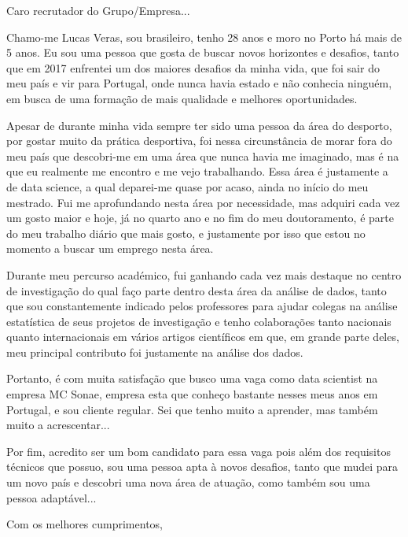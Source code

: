 \documentclass{letter}
\begin{document}
\begin{letter}{}

\opening{Caro recrutador do Grupo/Empresa...}

\vspace{2em}


Chamo-me Lucas Veras, sou brasileiro, tenho 28 anos e moro no Porto há mais de 5 anos. Eu sou uma pessoa que gosta de buscar novos horizontes e desafios, tanto que em 2017 enfrentei um dos maiores desafios da minha vida, que foi sair do meu país e vir para Portugal, onde nunca havia estado e não conhecia ninguém, em busca de uma formação de mais qualidade e melhores oportunidades.

Apesar de durante minha vida sempre ter sido uma pessoa da área do desporto, por gostar muito da prática desportiva, foi nessa circunstância de morar fora do meu país que descobri-me em uma área que nunca havia me imaginado, mas é na que eu realmente me encontro e me vejo trabalhando. Essa área é justamente a de data science, a qual deparei-me quase por acaso, ainda no início do meu mestrado. Fui me aprofundando nesta área por necessidade, mas adquiri cada vez um gosto maior e hoje, já no quarto ano e no fim do meu doutoramento, é parte do meu trabalho diário que mais gosto, e justamente por isso que estou no momento a buscar um emprego nesta área.

Durante meu percurso académico, fui ganhando cada vez mais destaque no centro de investigação do qual faço parte dentro desta área da análise de dados, tanto que sou constantemente indicado pelos professores para ajudar colegas na análise estatística de seus projetos de investigação e tenho colaborações tanto nacionais quanto internacionais em vários artigos científicos em que, em grande parte deles, meu principal contributo foi justamente na análise dos dados.

Portanto, é com muita satisfação que busco uma vaga como data scientist na empresa MC Sonae, empresa esta que conheço bastante nesses meus anos em Portugal, e sou cliente regular. Sei que tenho muito a aprender, mas também muito a acrescentar...

Por fim, acredito ser um bom candidato para essa vaga pois além dos requisitos técnicos que possuo, sou uma pessoa apta à novos desafios, tanto que mudei para um novo país e descobri uma nova área de atuação, como também sou uma pessoa adaptável... 


\vspace{2em}

\closing{Com os melhores cumprimentos,}

\end{letter}
\end{document}

